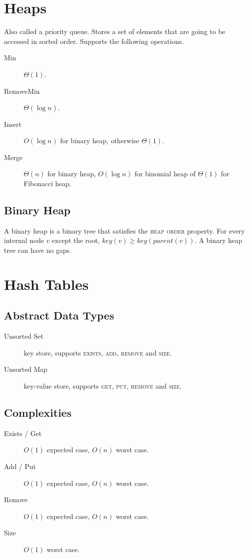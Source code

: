 \documentclass[landscape]{cheat}
\begin{document}
\begin{multicols}{3}
\section{Heaps}
Also called a priority queue.
Stores a set of elements that are going to be accessed in sorted order.
Supports the following operations.

\begin{description}
    \item[Min] $\Theta(1)$.
    \item[RemoveMin] $\Theta(\log n)$.
    \item[Insert] $O(\log n)$ for binary heap, otherwise $\Theta(1)$.
    \item[Merge] $\Theta(n)$ for binary heap, $O(\log n)$ for binomial heap of $\Theta(1)$ for Fibonacci heap.
\end{description}

\subsection{Binary Heap}
A binary heap is a binary tree that satisfies the \textsc{heap order} property.
For every internal node $v$ except the root, $key(v) \geq key(parent(v))$.
A binary heap tree can have no gaps.

\section{Hash Tables}

\subsection{Abstract Data Types}
\begin{description}
    \item[Unsorted Set] key store,
        supports \textsc{exists}, \textsc{add}, \textsc{remove} and \textsc{size}.
    \item[Unsorted Map] key-value store,
        supports \textsc{get}, \textsc{put}, \textsc{remove} and \textsc{size}.
\end{description}

\subsection{Complexities}
\begin{description}
    \item[Exists / Get] $O(1)$ expected case, $O(n)$ worst case.
    \item[Add / Put] $O(1)$ expected case, $O(n)$ worst case.
    \item[Remove] $O(1)$ expected case, $O(n)$ worst case.
    \item[Size] $O(1)$ worst case.
\end{description}


\end{multicols}
\end{document}
